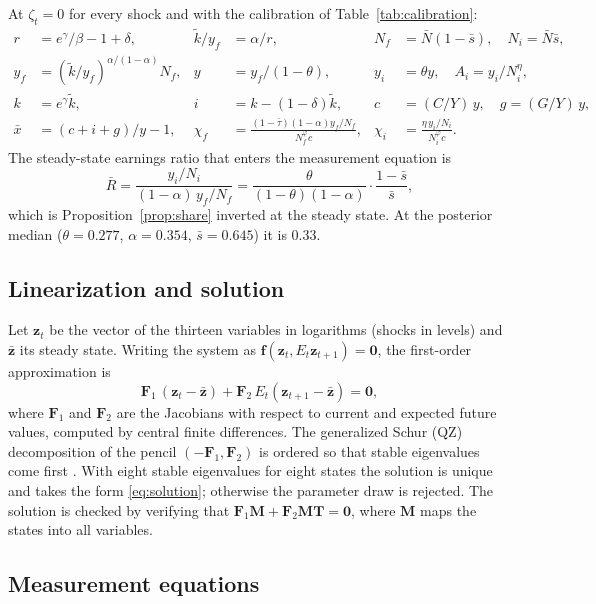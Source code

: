 At $\zeta_t=0$ for every shock and with the calibration of Table~\ref{tab:calibration}:
\begin{align*}
r &= e^{\gamma}/\beta-1+\delta, & \tilde k/y_f &= \alpha/r, & N_f &= \bar N(1-\bar s),\quad N_i=\bar N\bar s,\\
y_f &= (\tilde k/y_f)^{\alpha/(1-\alpha)}N_f, & y &= y_f/(1-\theta), & y_i&=\theta y,\quad A_i = y_i/N_i^{\eta},\\
k &= e^{\gamma}\tilde k, & i &= k-(1-\delta)\tilde k, & c &= (C/Y)\,y,\quad g=(G/Y)\,y,\\
\bar x &= (c+i+g)/y-1, & \chi_f &= \frac{(1-\bar\tau)(1-\alpha)y_f/N_f}{N_f^{\varphi}c}, & \chi_i &= \frac{\eta\,y_i/N_i}{N_i^{\varphi}c}.
\end{align*}
The steady-state earnings ratio that enters the measurement equation is
\[
\bar R = \frac{y_i/N_i}{(1-\alpha)\,y_f/N_f} = \frac{\theta}{(1-\theta)(1-\alpha)}\cdot\frac{1-\bar s}{\bar s},
\]
which is Proposition~\ref{prop:share} inverted at the steady state. At the posterior median ($\theta=0.277$, $\alpha=0.354$, $\bar s=0.645$) it is 0.33.

\subsection{Linearization and solution}

Let $\bm{z}_t$ be the vector of the thirteen variables in logarithms (shocks in levels) and $\bar{\bm{z}}$ its steady state. Writing the system as $\bm{f}(\bm{z}_t, E_t\bm{z}_{t+1})=\bm{0}$, the first-order approximation is
\[
\bm{F}_1\,(\bm{z}_t-\bar{\bm{z}}) + \bm{F}_2\,E_t(\bm{z}_{t+1}-\bar{\bm{z}}) = \bm{0},
\]
where $\bm{F}_1$ and $\bm{F}_2$ are the Jacobians with respect to current and expected future values, computed by central finite differences. The generalized Schur (QZ) decomposition of the pencil $(-\bm{F}_1,\bm{F}_2)$ is ordered so that stable eigenvalues come first \citep{Klein2000}. With eight stable eigenvalues for eight states the solution is unique and takes the form \eqref{eq:solution}; otherwise the parameter draw is rejected. The solution is checked by verifying that $\bm{F}_1\bm{M} + \bm{F}_2\bm{M}\bm{T} = \bm{0}$, where $\bm{M}$ maps the states into all variables.

\subsection{Measurement equations}

